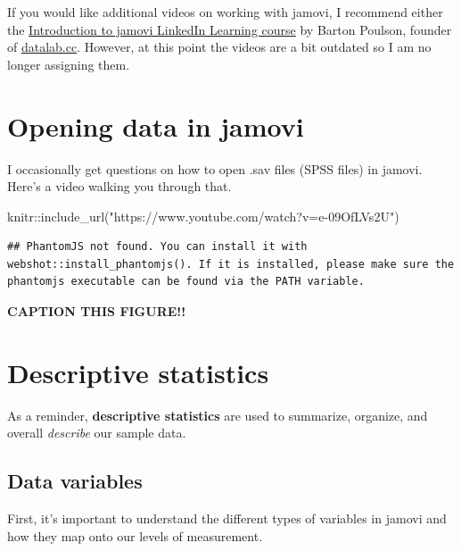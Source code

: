 \documentclass[
]{book}
\newenvironment{Shaded}{\begin{snugshade}}{\end{snugshade}}
\newcommand{\FunctionTok}[1]{\textcolor[rgb]{0.00,0.00,0.00}{#1}}
\newcommand{\NormalTok}[1]{#1}
\newcommand{\SpecialCharTok}[1]{\textcolor[rgb]{0.00,0.00,0.00}{#1}}
\newcommand{\StringTok}[1]{\textcolor[rgb]{0.31,0.60,0.02}{#1}}
\begin{document}
If you would like additional videos on working with jamovi, I recommend either the \href{https://www.linkedin.com/learning/introduction-to-jamovi/}{Introduction to jamovi LinkedIn Learning course} by Barton Poulson, founder of \href{https://datalab.cc/jamovi/}{datalab.cc}. However, at this point the videos are a bit outdated so I am no longer assigning them.

\hypertarget{opening-data-in-jamovi}{%
\section{Opening data in jamovi}\label{opening-data-in-jamovi}}

I occasionally get questions on how to open .sav files (SPSS files) in jamovi. Here's a video walking you through that.

\begin{Shaded}
\begin{Highlighting}[]
\NormalTok{knitr}\SpecialCharTok{::}\FunctionTok{include\_url}\NormalTok{(}\StringTok{"https://www.youtube.com/watch?v=e{-}09OfLVs2U"}\NormalTok{)}
\end{Highlighting}
\end{Shaded}

\begin{verbatim}
## PhantomJS not found. You can install it with webshot::install_phantomjs(). If it is installed, please make sure the phantomjs executable can be found via the PATH variable.
\end{verbatim}

\label{fig:unnamed-chunk-1}\textbf{CAPTION THIS FIGURE!!}

\hypertarget{descriptive-statistics}{%
\section{Descriptive statistics}\label{descriptive-statistics}}

As a reminder, \textbf{descriptive statistics} are used to summarize, organize, and overall \emph{describe} our sample data.

\hypertarget{data-variables}{%
\subsection{Data variables}\label{data-variables}}

First, it's important to understand the different types of variables in jamovi and how they map onto our levels of measurement.
\end{document}
